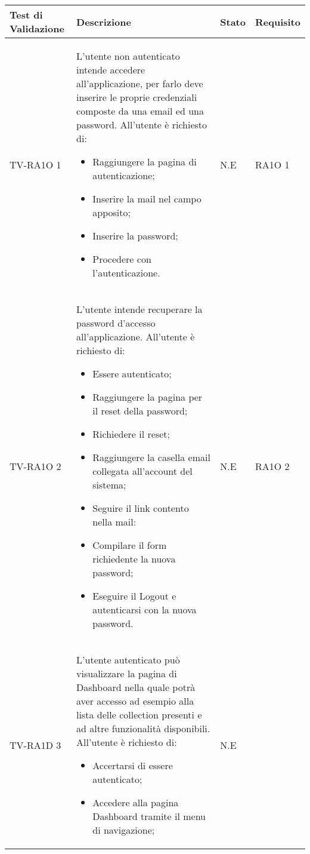 
  \begin{center}
  \def\arraystretch{1.5}
  \bgroup
    \begin{longtable}{| p{3cm} | p{6cm} | p{1.5cm} | p{2cm} | }
    \hline 
     \textbf{Test di Validazione} & \textbf{Descrizione} & \textbf{Stato} & \textbf{Requisito} \\ \hline
        TV-RA1O 1 & 
        L'utente non autenticato intende accedere all'applicazione, per farlo deve inserire le proprie credenziali composte da una email ed una password.
All'utente è richiesto di:
\begin{itemize}
\item Raggiungere la pagina di autenticazione;
\item Inserire la mail nel campo apposito;
\item Inserire la password;
\item Procedere con l'autenticazione.
\end{itemize}
 & N.E &       
            RA1O 1 \newline  \\ \hline 
        TV-RA1O 2 & 
        L'utente intende recuperare la password d'accesso all'applicazione.
All'utente è richiesto di:
\begin{itemize}
\item Essere autenticato;
\item Raggiungere la pagina per il reset della password;
\item Richiedere il reset;
\item Raggiungere la casella email collegata all'account del sistema;
\item Seguire il link contento nella mail:
\item Compilare il form richiedente la nuova password;
\item Eseguire il Logout e autenticarsi con la nuova password.
\end{itemize} & N.E &       
            RA1O 2 \newline  \\ \hline 
        TV-RA1D 3 & 
        L'utente autenticato può visualizzare la pagina di Dashboard nella quale potrà aver accesso ad esempio alla lista delle collection presenti e ad altre funzionalità disponibili.
All'utente è richiesto di:
\begin{itemize}
\item Accertarsi di essere autenticato;
\item Accedere alla pagina Dashboard tramite il menu di navigazione;
\end{itemize} & N.E &       

\end{longtable}
\end{center}
